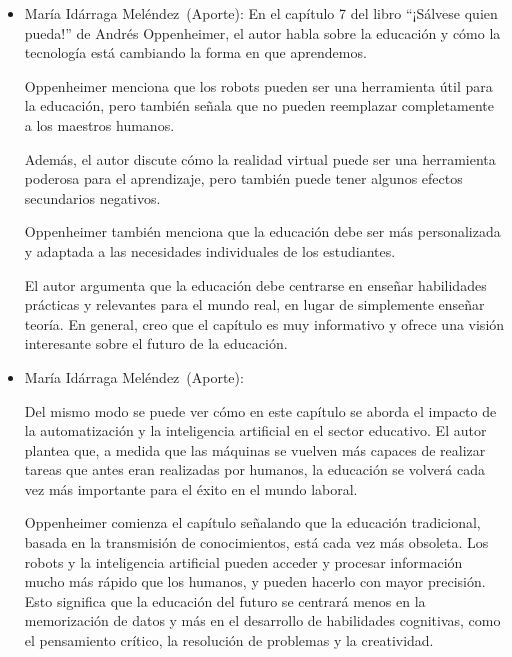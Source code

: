 \documentclass[letterpaper, 12pt]{article}
\newcommand{\memberMaria}{María Idárraga Meléndez~}
\begin{document}
\begin{itemize}[label=$\triangleright$]
      \item \memberMaria (Aporte):
            En el capítulo 7 del libro ``¡Sálvese quien pueda!'' de Andrés
            Oppenheimer, el autor habla sobre la educación y cómo la
            tecnología está cambiando la forma en que aprendemos.

            Oppenheimer menciona que los robots pueden ser una
            herramienta útil para la educación, pero también señala que
            no pueden reemplazar completamente a los maestros humanos.

            Además, el autor discute cómo la realidad virtual puede ser
            una herramienta poderosa para el aprendizaje, pero también
            puede tener algunos efectos secundarios negativos.

            Oppenheimer también menciona que la educación debe ser más
            personalizada y adaptada a las necesidades individuales de
            los estudiantes.

            El autor argumenta que la educación debe centrarse en
            enseñar habilidades prácticas y relevantes para el mundo
            real, en lugar de simplemente enseñar teoría. En general,
            creo que el capítulo es muy informativo y ofrece una visión
            interesante sobre el futuro de la educación.

      \item \memberMaria (Aporte):

            Del mismo modo se puede ver cómo en este capítulo se aborda
            el impacto de la automatización y la inteligencia
            artificial en el sector educativo. El autor plantea que, a
            medida que las máquinas se vuelven más capaces de realizar
            tareas que antes eran realizadas por humanos, la educación
            se volverá cada vez más importante para el éxito en el
            mundo laboral.

            Oppenheimer comienza el capítulo señalando que la educación
            tradicional, basada en la transmisión de conocimientos,
            está cada vez más obsoleta. Los robots y la inteligencia
            artificial pueden acceder y procesar información mucho más
            rápido que los humanos, y pueden hacerlo con mayor
            precisión. Esto significa que la educación del futuro se
            centrará menos en la memorización de datos y más en el
            desarrollo de habilidades cognitivas, como el pensamiento
            crítico, la resolución de problemas y la creatividad.


\end{itemize}
\end{document}
